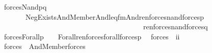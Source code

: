 \begin{isabellebody}
\ \ {\isachardoublequoteopen}forces{\isacharprime}{\kern0pt}{\isacharparenleft}{\kern0pt}Nand{\isacharparenleft}{\kern0pt}p{\isacharcomma}{\kern0pt}q{\isacharparenright}{\kern0pt}{\isacharparenright}{\kern0pt}\ \ \ {\isacharequal}{\kern0pt}\isanewline
\ \ \ \ \ \ \ \ Neg{\isacharparenleft}{\kern0pt}Exists{\isacharparenleft}{\kern0pt}And{\isacharparenleft}{\kern0pt}Member{\isacharparenleft}{\kern0pt}{}{\isacharcomma}{\kern0pt}{}{\isacharparenright}{\kern0pt}{\isacharcomma}{\kern0pt}And{\isacharparenleft}{\kern0pt}leq{\isacharunderscore}{\kern0pt}fm{\isacharparenleft}{\kern0pt}{}{\isacharcomma}{\kern0pt}{}{\isacharcomma}{\kern0pt}{}{\isacharparenright}{\kern0pt}{\isacharcomma}{\kern0pt}And{\isacharparenleft}{\kern0pt}ren{\isacharunderscore}{\kern0pt}forces{\isacharunderscore}{\kern0pt}nand{\isacharparenleft}{\kern0pt}forces{\isacharprime}{\kern0pt}{\isacharparenleft}{\kern0pt}p{\isacharparenright}{\kern0pt}{\isacharparenright}{\kern0pt}{\isacharcomma}{\kern0pt}\isanewline
\ \ \ \ \ \ \ \ \ \ \ \ \ \ \ \ \ \ \ \ \ \ \ \ \ \ \ \ \ \ \ \ \ \ \ \ \ \ \ \ \ ren{\isacharunderscore}{\kern0pt}forces{\isacharunderscore}{\kern0pt}nand{\isacharparenleft}{\kern0pt}forces{\isacharprime}{\kern0pt}{\isacharparenleft}{\kern0pt}q{\isacharparenright}{\kern0pt}{\isacharparenright}{\kern0pt}{\isacharparenright}{\kern0pt}{\isacharparenright}{\kern0pt}{\isacharparenright}{\kern0pt}{\isacharparenright}{\kern0pt}{\isacharparenright}{\kern0pt}{\isachardoublequoteclose}\isanewline
\ \ {\isachardoublequoteopen}forces{\isacharprime}{\kern0pt}{\isacharparenleft}{\kern0pt}Forall{\isacharparenleft}{\kern0pt}p{\isacharparenright}{\kern0pt}{\isacharparenright}{\kern0pt}\ \ \ {\isacharequal}{\kern0pt}\ Forall{\isacharparenleft}{\kern0pt}ren{\isacharunderscore}{\kern0pt}forces{\isacharunderscore}{\kern0pt}forall{\isacharparenleft}{\kern0pt}forces{\isacharprime}{\kern0pt}{\isacharparenleft}{\kern0pt}p{\isacharparenright}{\kern0pt}{\isacharparenright}{\kern0pt}{\isacharparenright}{\kern0pt}{\isachardoublequoteclose}\isanewline
\isanewline
\isanewline
{}\isamarkupfalse%
\isanewline
\ \ forces\ {\isacharcolon}{\kern0pt}{\isacharcolon}{\kern0pt}\ {\isachardoublequoteopen}i{\isasymRightarrow}i{\isachardoublequoteclose}\ \isanewline
\ \ {\isachardoublequoteopen}forces{\isacharparenleft}{\kern0pt}{\isasymphi}{\isacharparenright}{\kern0pt}\ {\isasymequiv}\ And{\isacharparenleft}{\kern0pt}Member{\isacharparenleft}{\kern0pt}{}{\isacharcomma}{\kern0pt}{}{\isacharparenright}{\kern0pt}{\isacharcomma}{\kern0pt}forces{\isacharprime}{\kern0pt}{\isacharparenleft}{\kern0pt}{\isasymphi}{\isacharparenright}{\kern0pt}{\isacharparenright}{\kern0pt}{\isachardoublequoteclose}\isanewline

\end{isabellebody}
